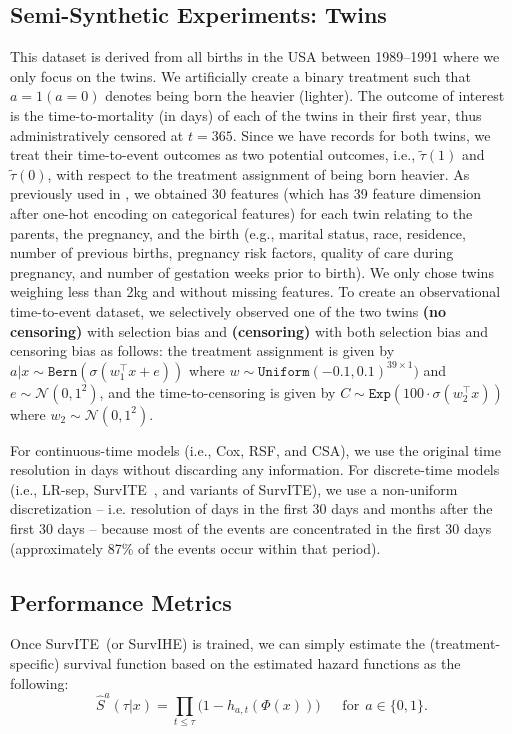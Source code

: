 \documentclass{article}
\newcommand{\Norm}{{\mathcal{N}}}
\newcommand{\proposed}{{SurvITE}}
\begin{document}
\subsection{Semi-Synthetic Experiments: Twins}
This dataset is derived from all births in the USA between 1989--1991 \cite{Almond:05} where we only focus on the twins. 
We artificially create a binary treatment such that $a = 1 (a = 0)$ denotes being born the heavier (lighter). The outcome of interest is the time-to-mortality (in days) of each of the twins in their first year, thus administratively censored at $t=365$. Since we have records for both twins, we treat their time-to-event outcomes as two potential outcomes, i.e., $\tilde{\tau}(1)$ and $\tilde{\tau}(0)$, with respect to the treatment assignment of being born heavier. 
As previously used in \cite{yoon2018ganite, louizos2017causal}, we obtained 30 features (which has 39 feature dimension after one-hot encoding on categorical features)  for each twin relating to the parents, the pregnancy, and the birth (e.g., marital status, race, residence, number of previous births, pregnancy risk factors, quality of care during pregnancy, and number of gestation weeks prior to birth). We only chose twins weighing less than 2kg and without missing features. To create an observational time-to-event dataset, we selectively observed one of the two twins \textbf{(no censoring)} with selection bias and \textbf{(censoring)} with both selection bias and censoring bias as follows: the treatment assignment is given by $a|x \sim \texttt{Bern}(\sigma(w_{1}^{\top}x + e))$ where $w\sim \texttt{Uniform}(-0.1, 0.1)^{39\times1})$ and $e\sim \Norm(0, 1^{2})$, and the time-to-censoring is given by $C\sim \texttt{Exp}(100 \cdot \sigma(w_{2}^{\top} x))$ where $w_{2}\sim \Norm(0, 1^{2})$. 

For continuous-time models (i.e., Cox, RSF, and CSA), we use the original time resolution in days without discarding any information. For discrete-time models (i.e., LR-sep, \proposed~, and variants of \proposed), we use a non-uniform discretization -- i.e. resolution of days in the first 30 days and months after the first 30 days -- because most of the events are concentrated in the first 30 days (approximately 87\% of the events occur within that period).





\subsection{Performance Metrics}
Once \proposed~(or SurvIHE) is trained, we can simply estimate the (treatment-specific) survival function based on the estimated hazard functions as the following:
\begin{equation}
    \hat{S}^{a}(\tau|x) = \prod_{t\leq \tau} \big( 1 - h_{a,t}(\Phi(x)) \big)~~~~~~~\text{for}~~a\in\{0,1\}.
\end{equation}
\end{document}
